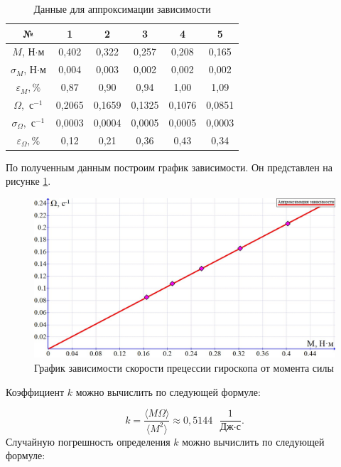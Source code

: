\documentclass[a4paper,12pt]{article} %
\begin{document}
\begin{table}[H]
	\centering
	\begin{tabular}{|c|c|c|c|c|c|}
		\hline
		№             & 1  & 2  & 3  & 4  & 5  \\
		\hline \hline
		$ M $, Н$\cdot$м             & 0,402  & 0,322  & 0,257  & 0,208  & 0,165  \\ \hline
		$ \sigma_M $, Н$\cdot$м       & 0,004  & 0,003  & 0,002  & 0,002  & 0,002  \\ \hline
		$ \varepsilon_M, \% $  & 0,87   & 0,90   & 0,94   & 1,00   & 1,09   \\ \hline \hline
		$ \Omega, \text{ с}^{-1} $          & 0,2065 & 0,1659 & 0,1325 & 0,1076 & 0,0851 \\ \hline
		$ \sigma_\Omega, \text{ с}^{-1} $    & 0,0003 & 0,0004 & 0,0005 & 0,0005 & 0,0003 \\ \hline
		$ \varepsilon_\Omega, \% $ & 0,12   & 0,21   & 0,36   & 0,43   & 0,34   \\ \hline
	\end{tabular}
	\caption{Данные для аппроксимации зависимости}
	\label{mnk}
\end{table}

По полученным данным построим график зависимости. Он представлен на рисунке \ref{graph}.

\begin{figure}[h!]
	\includegraphics[scale=0.388]{graph.jpg}
	\caption{График зависимости скорости прецессии гироскопа от момента силы}
	\label{graph}
\end{figure}

Коэффициент $ k $ можно вычислить по следующей формуле:\label{k}

\begin{equation}
k = \frac{\langle M\Omega\rangle}{\langle M^2 \rangle} \approx 0,5144 \text{ } \frac{1}{\text{Дж} \cdot \text{с}}.
\end{equation}
Случайную погрешность определения $ k $ можно вычислить по следующей формуле:
\end{document}
